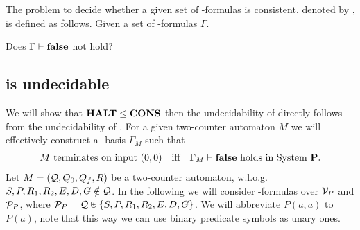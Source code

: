\begin{definition}
	The problem to decide whether a given set of \SysP-formulas is consistent, denoted by \PCons, is defined as follows.
	Given a set of \SysP-formulas $\Gamma$. 
	\begin{center}
		Does $\Gamma\vdash\textbf{false}$ not hold?
	\end{center}
\end{definition}
\subsection{\PCons{} is undecidable}
We will show that $\textbf{HALT}\leq\textbf{CONS}$ then the undecidability of \PCons{} directly follows from the undecidability of \autHalt. For a given two-counter automaton $M$ we will effectively construct a \SysP-basis $\Gamma_M$ such that
\begin{align*}
 & \text{$M$ terminates on input $(0,0)$} &   & \text{iff} & \text{$\Gamma_M\vdash\textbf{false}$ holds in System \textbf{P}.} 
\end{align*}
Let $M=(\mathcal{Q},Q_0,Q_f,R)$ be a two-counter automaton, w.l.o.g. $S,P,R_1,R_2,E,D,G\notin\mathcal{Q}$. In the following we will consider \SysP-formulas over $\mathcal{V}_P$ and $\mathcal{P}_P$, where $\mathcal{P}_P=\mathcal{Q}\uplus\{S,P,R_1,R_2,E,D,G\}$. We will abbreviate $P(a,a)$ to $P(a)$, note that this way we can use binary predicate symbols as unary ones.


